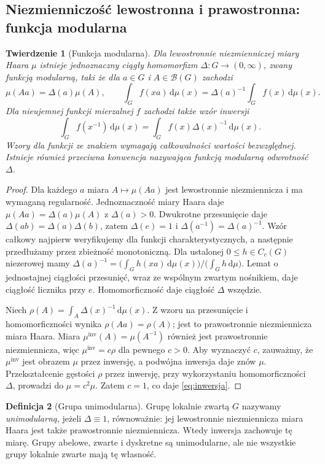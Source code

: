 \documentclass[11pt,a4paper]{article}
\numberwithin{equation}{section}
\theoremstyle{plain}
\newtheorem{twierdzenie}{Twierdzenie}[section]
\theoremstyle{definition}
\newtheorem{definicja}[twierdzenie]{Definicja}
\theoremstyle{remark}
\begin{document}
\subsection*{Niezmienniczość lewostronna i prawostronna: funkcja modularna}
\begin{twierdzenie}[Funkcja modularna]
Dla lewostronnie niezmienniczej miary Haara $\mu$ istnieje jednoznaczny ciągły homomorfizm $\Delta:G\to(0,\infty)$, zwany \emph{funkcją modularną}, taki że dla $a\in G$ i $A\in\mathcal B(G)$ zachodzi
\begin{equation}\label{eq:modularna}
\mu(Aa)=\Delta(a)\mu(A),\qquad
\int_G f(xa)\,\mathrm d\mu(x)=\Delta(a)^{-1}\int_Gf(x)\,\mathrm d\mu(x).
\end{equation}
Dla nieujemnej funkcji mierzalnej $f$ zachodzi także wzór inwersji
\begin{equation}\label{eq:inwersja}
\int_G f(x^{-1})\,\mathrm d\mu(x)=\int_G f(x)\Delta(x)^{-1}\,\mathrm d\mu(x).
\end{equation}
Wzory dla funkcji ze znakiem wymagają całkowalności wartości bezwzględnej. Istnieje również przeciwna konwencja nazywająca funkcją modularną odwrotność $\Delta$.
\end{twierdzenie}
\begin{proof}
Dla każdego $a$ miara $A\mapsto\mu(Aa)$ jest lewostronnie niezmiennicza i ma wymaganą regularność. Jednoznaczność miary Haara daje $\mu(Aa)=\Delta(a)\mu(A)$ z $\Delta(a)>0$. Dwukrotne przesunięcie daje $\Delta(ab)=\Delta(a)\Delta(b)$, zatem $\Delta(e)=1$ i $\Delta(a^{-1})=\Delta(a)^{-1}$. Wzór całkowy najpierw weryfikujemy dla funkcji charakterystycznych, a następnie przedłużamy przez zbieżność monotoniczną. Dla ustalonej $0\le h\in C_c(G)$ niezerowej mamy
$\Delta(a)^{-1}=\bigl(\int_Gh(xa)\,\mathrm d\mu(x)\bigr)/\bigl(\int_Gh\,\mathrm d\mu\bigr)$.
Lemat o jednostajnej ciągłości przesunięć, wraz ze wspólnym zwartym nośnikiem, daje ciągłość licznika przy $e$. Homomorficzność daje ciągłość $\Delta$ wszędzie.

Niech $\rho(A)=\int_A\Delta(x)^{-1}\,\mathrm d\mu(x)$. Z wzoru na przesunięcie i homomorficzności wynika $\rho(Aa)=\rho(A)$; jest to prawostronnie niezmiennicza miara Haara. Miara $\mu^{\mathrm{inv}}(A)=\mu(A^{-1})$ również jest prawostronnie niezmiennicza, więc $\mu^{\mathrm{inv}}=c\rho$ dla pewnego $c>0$. Aby wyznaczyć $c$, zauważmy, że $\mu^{\mathrm{inv}}$ jest obrazem $\mu$ przez inwersję, a podwójna inwersja daje znów $\mu$. Przekształcenie gęstości $\rho$ przez inwersję, przy wykorzystaniu homomorficzności $\Delta$, prowadzi do $\mu=c^2\mu$. Zatem $c=1$, co daje \eqref{eq:inwersja}.
\end{proof}
\begin{definicja}[Grupa unimodularna]
Grupę lokalnie zwartą $G$ nazywamy \emph{unimodularną}, jeżeli $\Delta\equiv1$, równoważnie: jej lewostronnie niezmiennicza miara Haara jest także prawostronnie niezmiennicza. Wtedy inwersja zachowuje tę miarę. Grupy abelowe, zwarte i dyskretne są unimodularne, ale nie wszystkie grupy lokalnie zwarte mają tę własność.
\end{definicja}
\end{document}
